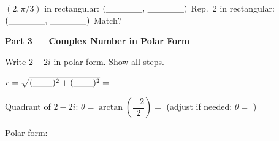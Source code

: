 \documentclass[10pt]{article}
\begin{document}
\begin{tcolorbox}[colback=white, colframe=black!40,
    title=\textbf{Tier A --- Apply},
    fonttitle=\bfseries, arc=2mm, left=3mm, right=3mm, top=2mm, bottom=2mm]
\vspace{4pt}
$(2,\pi/3)$ in rectangular: $(\underline{\hspace{1.5cm}},\, \underline{\hspace{1.5cm}})$
\quad Rep.\ 2 in rectangular: $(\underline{\hspace{1.5cm}},\, \underline{\hspace{1.5cm}})$
\quad Match? \underline{\hspace{1cm}}

\vspace{10pt}
\textbf{Part 3 --- Complex Number in Polar Form}

Write $2 - 2i$ in polar form. Show all steps.

\vspace{4pt}
$r = \sqrt{(\underline{\hspace{0.8cm}})^2 + (\underline{\hspace{0.8cm}})^2} = $ \underline{\hspace{2cm}}

\vspace{4pt}
Quadrant of $2-2i$: \underline{\hspace{1.5cm}} \qquad
$\theta = \arctan\!\left(\dfrac{-2}{2}\right) = $ \underline{\hspace{2cm}}
(adjust if needed: $\theta = $ \underline{\hspace{2cm}})

\vspace{4pt}
Polar form: \underline{\hspace{6cm}}

\end{tcolorbox}

\vspace{0.08in}
\end{document}
